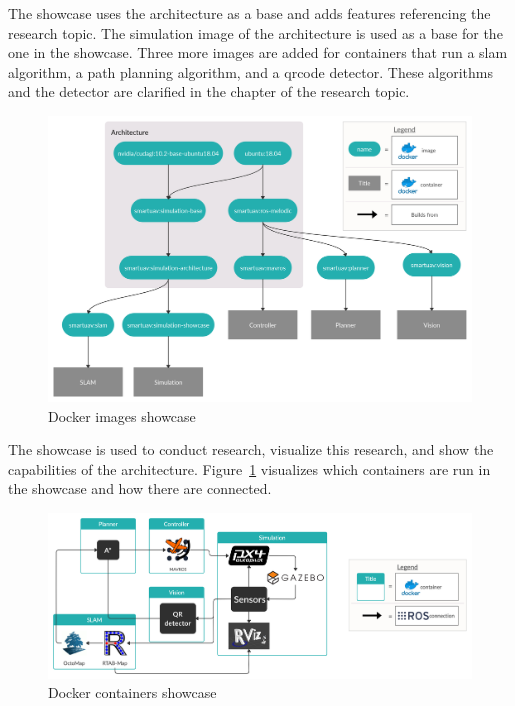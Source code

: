 The showcase uses the architecture as a base and adds features referencing the research topic. The simulation image of the architecture is used as a base for the one in the showcase. Three more images are added for containers that run a \acs{slam} algorithm, a path planning algorithm, and a \acs{qrcode} detector. These algorithms and the detector are clarified in the chapter of the research topic.

\begin{figure}[!h]
  \centering
  \includegraphics[width=\linewidth]{images/showcase_images.png}
  \caption{Docker images showcase}
\end{figure}

\clearpage

The showcase is used to conduct research, visualize this research, and show the capabilities of the architecture. Figure~\ref{fig:showcase_containers} visualizes which containers are run in the showcase and how there are connected.

\begin{figure}[!h]
  \centering
  \includegraphics[width=\linewidth]{images/showcase_containers.png}
  \caption{Docker containers showcase}
  \label{fig:showcase_containers}
\end{figure}
